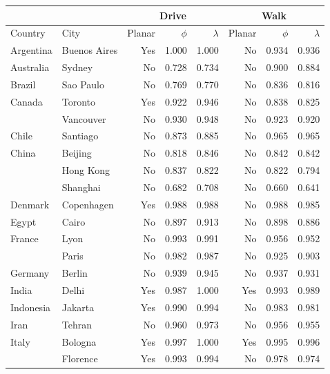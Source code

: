 \begin{tabular}{ l l r r r r r r  }
\toprule
         &               & \multicolumn{3}{|c|}{Drive}         & \multicolumn{3}{c}{Walk}            \\
\midrule
Country      & City          &  Planar  &  $\phi$   &  $\lambda$   &  Planar  &  $\phi$   &  $\lambda$   \\
\midrule
Argentina & Buenos Aires &      Yes &  1.000 &  1.000 &       No &  0.934 &  0.936 \\
Australia & Sydney &       No &  0.728 &  0.734 &       No &  0.900 &  0.884 \\
Brazil & Sao Paulo &       No &  0.769 &  0.770 &       No &  0.836 &  0.816 \\
Canada & Toronto &      Yes &  0.922 &  0.946 &       No &  0.838 &  0.825 \\
& Vancouver &       No &  0.930 &  0.948 &       No &  0.923 &  0.920 \\
Chile & Santiago &       No &  0.873 &  0.885 &       No &  0.965 &  0.965 \\
China & Beijing &       No &  0.818 &  0.846 &       No &  0.842 &  0.842 \\
& Hong Kong &       No &  0.837 &  0.822 &       No &  0.822 &  0.794 \\
& Shanghai &       No &  0.682 &  0.708 &       No &  0.660 &  0.641 \\
Denmark & Copenhagen &      Yes &  0.988 &  0.988 &       No &  0.988 &  0.985 \\
Egypt & Cairo &       No &  0.897 &  0.913 &       No &  0.898 &  0.886 \\
France & Lyon &       No &  0.993 &  0.991 &       No &  0.956 &  0.952 \\
& Paris &       No &  0.982 &  0.987 &       No &  0.925 &  0.903 \\
Germany & Berlin &       No &  0.939 &  0.945 &       No &  0.937 &  0.931 \\
India & Delhi &      Yes &  0.987 &  1.000 &      Yes &  0.993 &  0.989 \\
Indonesia & Jakarta &      Yes &  0.990 &  0.994 &       No &  0.983 &  0.981 \\
Iran & Tehran &       No &  0.960 &  0.973 &       No &  0.956 &  0.955 \\
Italy & Bologna &      Yes &  0.997 &  1.000 &      Yes &  0.995 &  0.996 \\
& Florence &      Yes &  0.993 &  0.994 &       No &  0.978 &  0.974 \\

\end{tabular}
